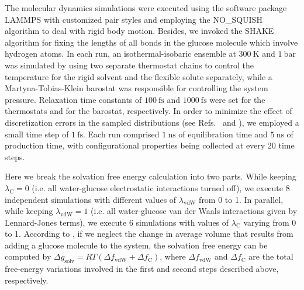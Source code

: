 \documentclass[journal=jctcce,manuscript=article,layout=twocolumn]{achemso}
\begin{document}
The molecular dynamics simulations were executed using the software package LAMMPS \cite{Plimpton_1995} with customized pair styles and employing the NO\_SQUISH algorithm \cite{Dullweber_1997, Miller_2002, Silveira_2017} to deal with rigid body motion. Besides, we invoked the SHAKE algorithm \cite{Ryckaert_1977} for fixing the lengths of all bonds in the glucose molecule which involve hydrogen atoms. In each run, an isothermal-isobaric ensemble at $300~\text{K}$ and $1~\text{bar}$ was simulated by using two separate thermostat chains to control the temperature for the rigid solvent\cite{Kamberaj_2005} and the flexible solute\cite{Martyna_1994} separately, while a Martyna-Tobias-Klein barostat\cite{Martyna_1994} was responsible for controlling the system pressure. Relaxation time constants of $100~\text{fs}$ and $1000~\text{fs}$ were set for the thermostats and for the barostat, respectively. In order to minimize the effect of discretization errors in the sampled distributions (see Refs.~ and ), we employed a small time step of $1~\text{fs}$. Each run comprised $1~\text{ns}$ of equilibration time and $5~\text{ns}$ of production time, with configurational properties being collected at every 20 time steps.

Here we break the solvation free energy calculation into two parts. While keeping $\lambda_\text{C} = 0$ (i.e. all water-glucose electrostatic interactions turned off), we execute 8 independent simulations with different values of $\lambda_\text{vdW}$ from 0 to 1. In parallel, while keeping $\lambda_\text{vdW} = 1$ (i.e. all water-glucose van der Waals interactions given by Lennard-Jones terms), we execute 6 simulations with values of $\lambda_\text{C}$ varying from 0 to 1. According to \citeauthor{Shirts_2003b} \cite{Shirts_2003b}, if we neglect the change in average volume that results from adding a glucose molecule to the system, the solvation free energy can be computed by ${\Delta g}_\text{solv} = RT (\Delta f_\text{vdW} + \Delta f_\text{C})$, where $\Delta f_\text{vdW}$ and $\Delta f_\text{C}$ are the total free-energy variations involved in the first and second steps described above, respectively.
\end{document}
